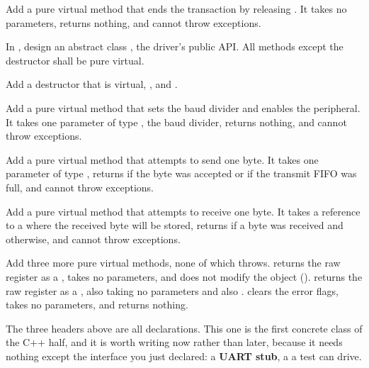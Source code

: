 Add a pure virtual method  that ends the transaction by releasing . It takes no
parameters, returns nothing, and cannot throw exceptions.

\label{c6:set:3}

\label{c6:ex:3.1}
In , design an abstract class ,
the driver's public API. All methods except the destructor shall be pure virtual.

Add a destructor that is virtual, , and .

Add a pure virtual method  that sets the baud divider and enables the peripheral.
It takes one parameter of type , the baud divider, returns nothing, and cannot throw
exceptions.

Add a pure virtual method  that attempts to send one byte. It takes one parameter of
type , returns  if the byte was accepted or  if the transmit
FIFO was full, and cannot throw exceptions.

Add a pure virtual method  that attempts to receive one byte. It takes a reference to a
 where the received byte will be stored, returns  if a byte was received and
 otherwise, and cannot throw exceptions.

Add three more pure virtual methods, none of which throws.  returns the raw
 register as a , takes no parameters, and does not modify the object
().  returns the raw  register as a
, also taking no parameters and also .  clears the
error flags, takes no parameters, and returns nothing.

\label{c6:set:4}

\label{c6:ex:4.1}
The three headers above are all declarations. This one is the first concrete class of the C++
half, and it is worth writing now rather than later, because it needs nothing except the interface
you just declared: a \textbf{UART stub}, a  a test can drive.

